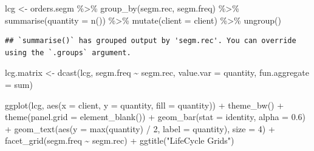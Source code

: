 \documentclass[
]{book}
\newenvironment{Shaded}{\begin{snugshade}}{\end{snugshade}}
\newcommand{\AttributeTok}[1]{\textcolor[rgb]{0.77,0.63,0.00}{#1}}
\newcommand{\DecValTok}[1]{\textcolor[rgb]{0.00,0.00,0.81}{#1}}
\newcommand{\FloatTok}[1]{\textcolor[rgb]{0.00,0.00,0.81}{#1}}
\newcommand{\FunctionTok}[1]{\textcolor[rgb]{0.00,0.00,0.00}{#1}}
\newcommand{\NormalTok}[1]{#1}
\newcommand{\OtherTok}[1]{\textcolor[rgb]{0.56,0.35,0.01}{#1}}
\newcommand{\SpecialCharTok}[1]{\textcolor[rgb]{0.00,0.00,0.00}{#1}}
\newcommand{\StringTok}[1]{\textcolor[rgb]{0.31,0.60,0.02}{#1}}
\begin{document}
\begin{Shaded}
\begin{Highlighting}[]
\NormalTok{lcg }\OtherTok{\textless{}{-}}\NormalTok{ orders.segm }\SpecialCharTok{\%\textgreater{}\%}
    \FunctionTok{group\_by}\NormalTok{(segm.rec, segm.freq) }\SpecialCharTok{\%\textgreater{}\%}
    \FunctionTok{summarise}\NormalTok{(}\AttributeTok{quantity =} \FunctionTok{n}\NormalTok{()) }\SpecialCharTok{\%\textgreater{}\%}
    \FunctionTok{mutate}\NormalTok{(}\AttributeTok{client =} \StringTok{\textquotesingle{}client\textquotesingle{}}\NormalTok{) }\SpecialCharTok{\%\textgreater{}\%}
    \FunctionTok{ungroup}\NormalTok{()}
\end{Highlighting}
\end{Shaded}

\begin{verbatim}
## `summarise()` has grouped output by 'segm.rec'. You can override using the `.groups` argument.
\end{verbatim}

\begin{Shaded}
\begin{Highlighting}[]
\NormalTok{lcg.matrix }\OtherTok{\textless{}{-}}
    \FunctionTok{dcast}\NormalTok{(lcg,}
\NormalTok{          segm.freq }\SpecialCharTok{\textasciitilde{}}\NormalTok{ segm.rec,}
          \AttributeTok{value.var =} \StringTok{\textquotesingle{}quantity\textquotesingle{}}\NormalTok{,}
          \AttributeTok{fun.aggregate =}\NormalTok{ sum)}

\FunctionTok{ggplot}\NormalTok{(lcg, }\FunctionTok{aes}\NormalTok{(}\AttributeTok{x =}\NormalTok{ client, }\AttributeTok{y =}\NormalTok{ quantity, }\AttributeTok{fill =}\NormalTok{ quantity)) }\SpecialCharTok{+}
    \FunctionTok{theme\_bw}\NormalTok{() }\SpecialCharTok{+}
    \FunctionTok{theme}\NormalTok{(}\AttributeTok{panel.grid =} \FunctionTok{element\_blank}\NormalTok{()) }\SpecialCharTok{+}
    \FunctionTok{geom\_bar}\NormalTok{(}\AttributeTok{stat =} \StringTok{\textquotesingle{}identity\textquotesingle{}}\NormalTok{, }\AttributeTok{alpha =} \FloatTok{0.6}\NormalTok{) }\SpecialCharTok{+}
    \FunctionTok{geom\_text}\NormalTok{(}\FunctionTok{aes}\NormalTok{(}\AttributeTok{y =} \FunctionTok{max}\NormalTok{(quantity) }\SpecialCharTok{/} \DecValTok{2}\NormalTok{, }\AttributeTok{label =}\NormalTok{ quantity), }\AttributeTok{size =} \DecValTok{4}\NormalTok{) }\SpecialCharTok{+}
    \FunctionTok{facet\_grid}\NormalTok{(segm.freq }\SpecialCharTok{\textasciitilde{}}\NormalTok{ segm.rec) }\SpecialCharTok{+}
    \FunctionTok{ggtitle}\NormalTok{(}\StringTok{"LifeCycle Grids"}\NormalTok{)}
\end{Highlighting}
\end{Shaded}
\end{document}
